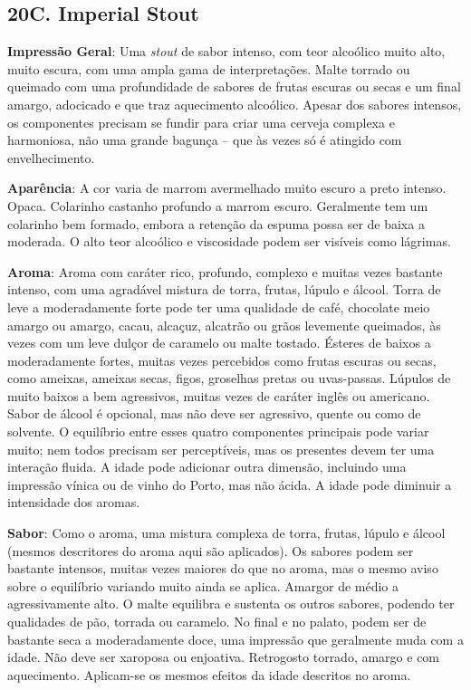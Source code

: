 \subsection*{20C. Imperial Stout}
\textbf{Impressão Geral}: Uma \textit{stout} de sabor intenso, com teor alcoólico muito alto, muito escura, com uma ampla gama de interpretações. Malte torrado ou queimado com uma profundidade de sabores de frutas escuras ou secas e um final amargo, adocicado e que traz aquecimento alcoólico. Apesar dos sabores intensos, os componentes precisam se fundir para criar uma cerveja complexa e harmoniosa, não uma grande bagunça – que às vezes só é atingido com envelhecimento.

\textbf{Aparência}: A cor varia de marrom avermelhado muito escuro a preto intenso. Opaca. Colarinho castanho profundo a marrom escuro. Geralmente tem um colarinho bem formado, embora a retenção da espuma possa ser de baixa a moderada. O alto teor alcoólico e viscosidade podem ser visíveis como lágrimas.

\textbf{Aroma}: Aroma com caráter rico, profundo, complexo e muitas vezes bastante intenso, com uma agradável mistura de torra, frutas, lúpulo e álcool. Torra de leve a moderadamente forte pode ter uma qualidade de café, chocolate meio amargo ou amargo, cacau, alcaçuz, alcatrão ou grãos levemente queimados, às vezes com um leve dulçor de caramelo ou malte tostado. Ésteres de baixos a moderadamente fortes, muitas vezes percebidos como frutas escuras ou secas, como ameixas, ameixas secas, figos, groselhas pretas ou uvas-passas. Lúpulos de muito baixos a bem agressivos, muitas vezes de caráter inglês ou americano. Sabor de álcool é opcional, mas não deve ser agressivo, quente ou como de solvente. O equilíbrio entre esses quatro componentes principais pode variar muito; nem todos precisam ser perceptíveis, mas os presentes devem ter uma interação fluida. A idade pode adicionar outra dimensão, incluindo uma impressão vínica ou de vinho do Porto, mas não ácida. A idade pode diminuir a intensidade dos aromas.

\textbf{Sabor}: Como o aroma, uma mistura complexa de torra, frutas, lúpulo e álcool (mesmos descritores do aroma aqui são aplicados). Os sabores podem ser bastante intensos, muitas vezes maiores do que no aroma, mas o mesmo aviso sobre o equilíbrio variando muito ainda se aplica. Amargor de médio a agressivamente alto. O malte equilibra e sustenta os outros sabores, podendo ter qualidades de pão, torrada ou caramelo. No final e no palato, podem ser de bastante seca a moderadamente doce, uma impressão que geralmente muda com a idade. Não deve ser xaroposa ou enjoativa. Retrogosto torrado, amargo e com aquecimento. Aplicam-se os mesmos efeitos da idade descritos no aroma.

